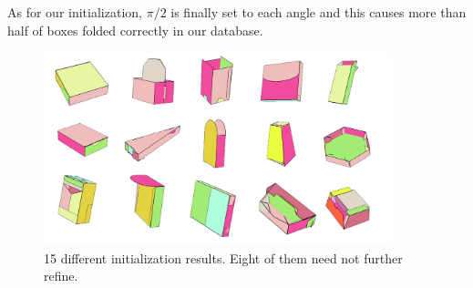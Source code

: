 As for our initialization, $\pi/2$ is finally set to each angle and this causes more than half of boxes folded correctly in our database.



\begin{figure}
	\centering
	\includegraphics[width=0.9\textwidth]{images/initial2.jpg}
	\caption{15 different initialization results. Eight of them need not further refine. }
	\label{fig:initial}
\end{figure}

